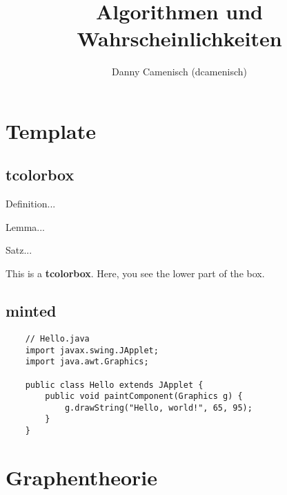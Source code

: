 \documentclass[a4paper]{report}
\title{Algorithmen und Wahrscheinlichkeiten}
\author{Danny Camenisch (dcamenisch)}
\begin{document}
\maketitle
\tableofcontents



\chapter{Template}
\section{tcolorbox}

\begin{definition}
    Definition...
\end{definition}

\begin{lemma}
    Lemma...
\end{lemma}

\begin{satz}
    Satz...
\end{satz}

\begin{tcolorbox}[colback=dcWhite,colframe=dcOrange,title=\textbf{My Heading}]
    This is a \textbf{tcolorbox}.
\tcblower
    Here, you see the lower part of the box.

\end{tcolorbox}

\section{minted}

\begin{verbatim}
    // Hello.java
    import javax.swing.JApplet;
    import java.awt.Graphics;
    
    public class Hello extends JApplet {
        public void paintComponent(Graphics g) {
            g.drawString("Hello, world!", 65, 95);
        }    
    }
\end{verbatim}




\chapter{Graphentheorie}
\end{document}
